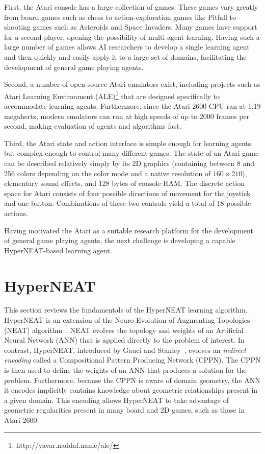 \documentclass{acm_proc_article-sp}
\begin{document}
First, the Atari console has a large collection of games. These games vary greatly from board games such as chess to action-exploration games like Pitfall to shooting games such as Asteroids and Space Invaders. Many games have support for a second player, opening the possibility of multi-agent learning. Having such a large number of games allows AI researchers to develop a single learning agent and then quickly and easily apply it to a large set of domains, facilitating the development of general game playing agents.

Second, a number of open-source Atari emulators exist, including projects such as Atari Learning Environment (ALE)\footnote{http://yavar.naddaf.name/ale/} that are designed specifically to accommodate learning agents. Furthermore, since the Atari 2600 CPU ran at 1.19 megahertz, modern emulators can run at high speeds of up to 2000 frames per second, making evaluation of agents and algorithms fast.

Third, the Atari state and action interface is simple enough for learning agents, but complex enough to control many different games. The state of an Atari game can be described relatively simply by its 2D graphics (containing between 8 and 256 colors depending on the color mode and a native resolution of $160\times 210$), elementary sound effects, and 128 bytes of console RAM. The discrete action space for Atari consists of four possible directions of movement for the joystick and one button. Combinations of these two controls yield a total of 18 possible actions.

Having motivated the Atari as a suitable research platform for the development of general game playing agents, the next challenge is developing a capable HyperNEAT-based learning agent.

\section{HyperNEAT}
\label{sec:hyperneat}
This section reviews the fundamentals of the HyperNEAT learning algorithm. HyperNEAT is an extension of the Neuro Evolution of Augmenting Topologies (NEAT) algorithm~\cite{stanley02}. NEAT evolves the topology and weights of an Artificial Neural Network (ANN) that is applied directly to the problem of interest. In contrast, HyperNEAT, introduced by Gauci and Stanley~\cite{gauci08}, evolves an \emph{indirect encoding} called a Compositional Pattern Producing Network (CPPN). The CPPN is then used to define the weights of an ANN that produces a solution for the problem. Furthermore, because the CPPN is aware of domain geometry, the ANN it encodes implicitly contains knowledge about geometric relationships present in a given domain. This encoding allows HyperNEAT to take advantage of geometric regularities present in many board and 2D games, such as those in Atari 2600.
\end{document}

